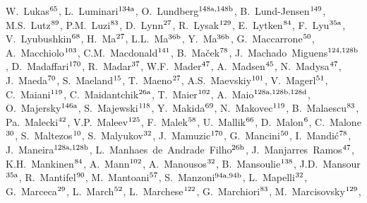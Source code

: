 \begin{flushleft}
W.~Lukas$^\textrm{\scriptsize 65}$,
L.~Luminari$^\textrm{\scriptsize 134a}$,
O.~Lundberg$^\textrm{\scriptsize 148a,148b}$,
B.~Lund-Jensen$^\textrm{\scriptsize 149}$,
M.S.~Lutz$^\textrm{\scriptsize 89}$,
P.M.~Luzi$^\textrm{\scriptsize 83}$,
D.~Lynn$^\textrm{\scriptsize 27}$,
R.~Lysak$^\textrm{\scriptsize 129}$,
E.~Lytken$^\textrm{\scriptsize 84}$,
F.~Lyu$^\textrm{\scriptsize 35a}$,
V.~Lyubushkin$^\textrm{\scriptsize 68}$,
H.~Ma$^\textrm{\scriptsize 27}$,
L.L.~Ma$^\textrm{\scriptsize 36b}$,
Y.~Ma$^\textrm{\scriptsize 36b}$,
G.~Maccarrone$^\textrm{\scriptsize 50}$,
A.~Macchiolo$^\textrm{\scriptsize 103}$,
C.M.~Macdonald$^\textrm{\scriptsize 141}$,
B.~Ma\v{c}ek$^\textrm{\scriptsize 78}$,
J.~Machado~Miguens$^\textrm{\scriptsize 124,128b}$,
D.~Madaffari$^\textrm{\scriptsize 170}$,
R.~Madar$^\textrm{\scriptsize 37}$,
W.F.~Mader$^\textrm{\scriptsize 47}$,
A.~Madsen$^\textrm{\scriptsize 45}$,
N.~Madysa$^\textrm{\scriptsize 47}$,
J.~Maeda$^\textrm{\scriptsize 70}$,
S.~Maeland$^\textrm{\scriptsize 15}$,
T.~Maeno$^\textrm{\scriptsize 27}$,
A.S.~Maevskiy$^\textrm{\scriptsize 101}$,
V.~Magerl$^\textrm{\scriptsize 51}$,
C.~Maiani$^\textrm{\scriptsize 119}$,
C.~Maidantchik$^\textrm{\scriptsize 26a}$,
T.~Maier$^\textrm{\scriptsize 102}$,
A.~Maio$^\textrm{\scriptsize 128a,128b,128d}$,
O.~Majersky$^\textrm{\scriptsize 146a}$,
S.~Majewski$^\textrm{\scriptsize 118}$,
Y.~Makida$^\textrm{\scriptsize 69}$,
N.~Makovec$^\textrm{\scriptsize 119}$,
B.~Malaescu$^\textrm{\scriptsize 83}$,
Pa.~Malecki$^\textrm{\scriptsize 42}$,
V.P.~Maleev$^\textrm{\scriptsize 125}$,
F.~Malek$^\textrm{\scriptsize 58}$,
U.~Mallik$^\textrm{\scriptsize 66}$,
D.~Malon$^\textrm{\scriptsize 6}$,
C.~Malone$^\textrm{\scriptsize 30}$,
S.~Maltezos$^\textrm{\scriptsize 10}$,
S.~Malyukov$^\textrm{\scriptsize 32}$,
J.~Mamuzic$^\textrm{\scriptsize 170}$,
G.~Mancini$^\textrm{\scriptsize 50}$,
I.~Mandi\'{c}$^\textrm{\scriptsize 78}$,
J.~Maneira$^\textrm{\scriptsize 128a,128b}$,
L.~Manhaes~de~Andrade~Filho$^\textrm{\scriptsize 26b}$,
J.~Manjarres~Ramos$^\textrm{\scriptsize 47}$,
K.H.~Mankinen$^\textrm{\scriptsize 84}$,
A.~Mann$^\textrm{\scriptsize 102}$,
A.~Manousos$^\textrm{\scriptsize 32}$,
B.~Mansoulie$^\textrm{\scriptsize 138}$,
J.D.~Mansour$^\textrm{\scriptsize 35a}$,
R.~Mantifel$^\textrm{\scriptsize 90}$,
M.~Mantoani$^\textrm{\scriptsize 57}$,
S.~Manzoni$^\textrm{\scriptsize 94a,94b}$,
L.~Mapelli$^\textrm{\scriptsize 32}$,
G.~Marceca$^\textrm{\scriptsize 29}$,
L.~March$^\textrm{\scriptsize 52}$,
L.~Marchese$^\textrm{\scriptsize 122}$,
G.~Marchiori$^\textrm{\scriptsize 83}$,
M.~Marcisovsky$^\textrm{\scriptsize 129}$,

\end{flushleft}
